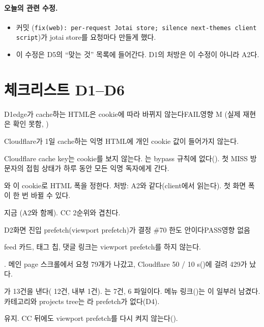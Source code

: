 \paragraph{오늘의 관련 수정.}
\begin{itemize}[nosep]
  \item 커밋 (\texttt{fix(web): per-request Jotai store; silence next-themes client script})가 jotai store를 요청마다 만들게 했다.
  \item 이 수정은 D5의 ``맞는 것'' 목록에 들어간다. D1의 처방은 이 수정이 아니라 A2다.
\end{itemize}

\section{체크리스트 D1--D6}\label{sec:cr-checklist}

\begin{checkitem}{\ckopen}{D1}{edge가 cache하는 HTML은 cookie에 따라 바뀌지 않는다}{FAIL\ckdot{}영향 M (실제 재현은 확인 못함, )}
  \item[What] Cloudflare가 1일 cache하는 익명 HTML에 개인 cookie 값이 들어가지 않는다.
  \item[Why] Cloudflare cache key는 cookie를 보지 않는다. 는 bypass 규칙에 없다(). 첫 MISS 방문자의 접힘 상태가 하루 동안 모든 익명 독자에게 간다.
  \item[How] 와 이 cookie로 HTML 폭을 정한다. 처방: A2와 같다(client에서 읽는다). 첫 화면 폭이 한 번 바뀔 수 있다.
  \item[When] 지금 (A2와 함께). CC 2순위와 겹친다.
\end{checkitem}

\begin{checkitem}{\ckdone}{D2}{화면 진입 prefetch(viewport prefetch)가 결정 \#70 한도 안이다}{PASS\ckdot{}영향 없음}
  \item[What] feed 카드, 태그 칩, 댓글 링크는 viewport prefetch를 하지 않는다.
  \item[Why] . 메인 page 스크롤에서 요청 79개가 나갔고, Cloudflare 50 / 10 s()에 걸려 429가 났다.
  \item[How] 가 13건을 낸다( 12건,  내부 1건). 는 7건, 6 파일이다. 메뉴 링크()는 이 일부러 남겼다. 카테고리와 projects tree는 라 prefetch가 없다(D4).
  \item[When] 유지. CC 뒤에도 viewport prefetch를 다시 켜지 않는다().
\end{checkitem}

